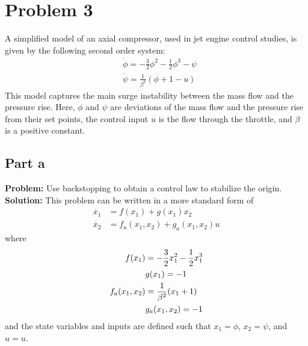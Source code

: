 \documentclass[letter]{article}
\begin{document}
\newpage
\section{Problem 3}
A simplified model of an axial compressor, used in jet engine control studies, is given by the following second order system:
\begin{equation}
	\begin{aligned}
		&\dot{\phi} = - \frac{3}{2} \phi^2 - \frac{1}{2} \phi^3 - \psi\\
		&\dot{\psi} = \frac{1}{\beta^2}(\phi + 1 - u)
	\end{aligned}
\end{equation}
This model captures the main surge instability between the mass flow and the pressure rise. Here, $\phi$ and $\psi$ are deviations of the mass flow and the pressure rise from their set points, the control input $u$ is the flow through the throttle, and $\beta$ is a positive constant.

\subsection{Part a}
\textbf{Problem:}
Use backstopping to obtain a control law to stabilize the origin.\\

\noindent
\textbf{Solution:}
This problem can be written in a more standard form of
\begin{align}\label{eq:backstep_original}
	\dot{x_1} &= f(x_1) + g(x_1) x_2\nonumber\\
	\dot{x_2} &= f_a(x_1,x_2) + g_a(x_1,x_2) u
\end{align}
where
\begin{align}
	f(x_1) &= -\frac{3}{2} x_1^2 - \frac{1}{2} x_1^3\\
	&g(x_1) = -1\nonumber \\
	f_a(x_1,x_2) &= \frac{1}{\beta^2} \qty(x_1 + 1)\\
	&g_a(x_1,x_2) = -1\nonumber
\end{align}
and the state variables and inputs are defined such that $x_1 = \phi$, $x_2 = \psi$, and $u = u$.
\end{document}
